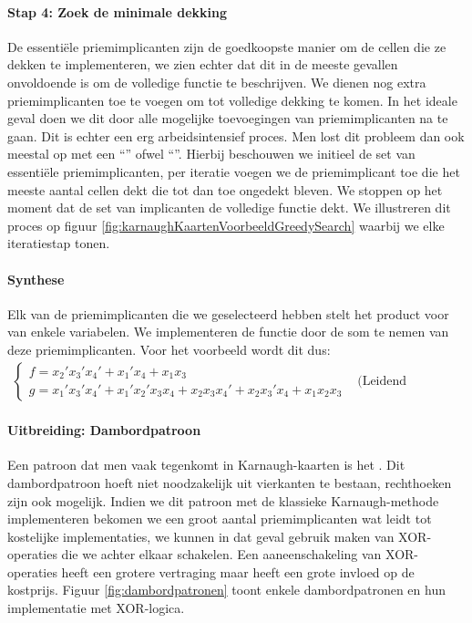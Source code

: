 \paragraph{Stap 4: Zoek de minimale dekking}
De essenti\"ele priemimplicanten zijn de goedkoopste manier om de cellen die ze dekken te implementeren, we zien echter dat dit in de meeste gevallen onvoldoende is om de volledige functie te beschrijven. We dienen nog extra priemimplicanten toe te voegen om tot volledige dekking te komen. In het ideale geval doen we dit door alle mogelijke toevoegingen van priemimplicanten na te gaan. Dit is echter een erg arbeidsintensief proces. Men lost dit probleem dan ook meestal op met een ``'' ofwel ``''. Hierbij beschouwen we initieel de set van essenti\"ele priemimplicanten, per iteratie voegen we de priemimplicant toe die het meeste aantal cellen dekt die tot dan toe ongedekt bleven. We stoppen op het moment dat de set van implicanten de volledige functie dekt. We illustreren dit proces op figuur \ref{fig:karnaughKaartenVoorbeeldGreedySearch} waarbij we elke iteratiestap tonen.
\paragraph{Synthese}
Elk van de priemimplicanten die we geselecteerd hebben stelt het product voor van enkele variabelen. We implementeren de functie door de som te nemen van deze priemimplicanten. Voor het voorbeeld wordt dit dus:
\begin{equation}
\begin{array}{ll}
\left\{
\begin{array}{l}
f=x_2'x_3'x_4'+x_1'x_4+x_1x_3\\
g=x_1'x_3'x_4'+x_1'x_2'x_3x_4+x_2x_3x_4'+x_2x_3'x_4+x_1x_2x_3
\end{array}\right.&\mbox{(Leidend voorbeeld)}
\end{array}
\end{equation}
\paragraph{Uitbreiding: Dambordpatroon}
Een patroon dat men vaak tegenkomt in Karnaugh-kaarten is het . Dit dambordpatroon hoeft niet noodzakelijk uit vierkanten te bestaan, rechthoeken zijn ook mogelijk. Indien we dit patroon met de klassieke Karnaugh-methode implementeren bekomen we een groot aantal priemimplicanten wat leidt tot kostelijke implementaties, we kunnen in dat geval gebruik maken van XOR-operaties die we achter elkaar schakelen. Een aaneenschakeling van XOR-operaties heeft een grotere vertraging maar heeft een grote invloed op de kostprijs. Figuur \ref{fig:dambordpatronen} toont enkele dambordpatronen en hun implementatie met XOR-logica.
